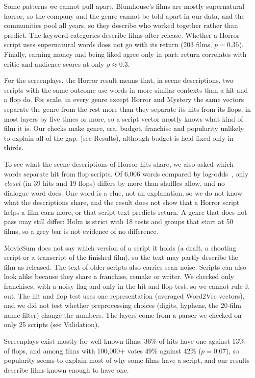\documentclass[9pt,twocolumn,twoside]{pnas-new}
\begin{document}
Some patterns we cannot pull apart. Blumhouse's films are mostly supernatural horror, so the company and the genre cannot be told apart in our data, and the communities pool all years, so they describe who worked together rather than predict. The keyword categories describe films after release. Whether a Horror script uses supernatural words does not go with its return (203 films, $p=0.35$). Finally, earning money and being liked agree only in part: return correlates with critic and audience scores at only $\rho\approx0.3$.

For the screenplays, the Horror result means that, in scene descriptions, two scripts with the same outcome use words in more similar contexts than a hit and a flop do. For scale, in every genre except Horror and Mystery the same vectors separate the genre from the rest more than they separate its hits from its flops, in most layers by five times or more, so a script vector mostly knows what kind of film it is. Our checks make genre, era, budget, franchise and popularity unlikely to explain all of the gap. (see Results), although budget is held fixed only in thirds. 

To see what the scene descriptions of Horror hits share, we also asked which words separate hit from flop scripts. Of 6,006 words compared by log-odds~\cite{monroe2008fightin}, only \emph{closet} (in 39 hits and 19 flops) differs by more than shuffles allow, and no dialogue word does. One word is a clue, not an explanation, so we do not know what the descriptions share, and the result does not show that a Horror script helps a film earn more, or that script text predicts return. A genre that does not pass may still differ: Holm is strict with 18 tests and groups that start at 50 films, so a grey bar is not evidence of no difference.

MovieSum does not say which version of a script it holds (a draft, a shooting script or a transcript of the finished film), so the text may partly describe the film as released. The text of older scripts also carries scan noise. Scripts can also look alike because they share a franchise, remake or writer. We checked only franchises, with a noisy flag and only in the hit and flop test, so we cannot rule it out. The hit and flop test uses one representation (averaged Word2Vec vectors), and we did not test whether preprocessing choices (digits, hyphens, the 20-film name filter) change the numbers. The layers come from a parser we checked on only 25 scripts (see Validation).

Screenplays exist mostly for well-known films: 36\% of hits have one against 13\% of flops, and among films with 100,000+ votes 49\% against 42\% ($p=0.07$), so popularity seems to explain most of why some films have a script, and our results describe films known enough to have one.
\end{document}
